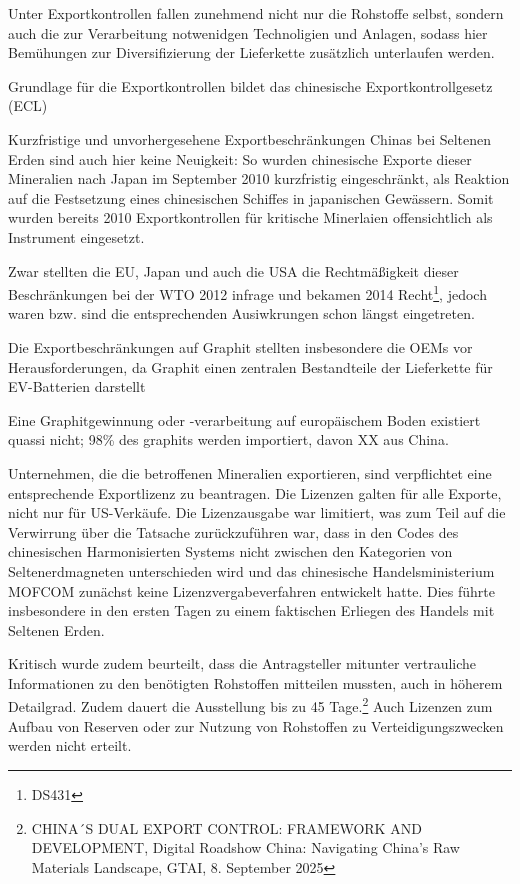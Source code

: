 \documentclass[12pt,a4paper,oneside]{book} %
\begin{document}
Unter Exportkontrollen fallen zunehmend nicht nur die Rohstoffe selbst, sondern auch die zur Verarbeitung notwenidgen Technoligien und Anlagen, sodass hier Bemühungen zur Diversifizierung der Lieferkette zusätzlich unterlaufen werden.\autocite{IEA Bericht 2026, S. 11.}

Grundlage für die Exportkontrollen bildet das chinesische Exportkontrollgesetz (ECL)

Kurzfristige und unvorhergesehene Exportbeschränkungen Chinas bei Seltenen Erden sind auch hier keine Neuigkeit: So wurden chinesische Exporte dieser Mineralien nach Japan im September 2010 kurzfristig eingeschränkt, als Reaktion auf die Festsetzung eines chinesischen Schiffes in japanischen Gewässern. Somit wurden bereits 2010 Exportkontrollen für kritische Minerlaien offensichtlich als Instrument eingesetzt.

Zwar stellten die EU, Japan und auch die USA die Rechtmäßigkeit dieser Beschränkungen bei der WTO 2012 infrage und bekamen 2014 Recht\footnote{DS431}, jedoch waren bzw. sind die entsprechenden Ausiwkrungen schon längst eingetreten.

Die Exportbeschränkungen auf Graphit stellten insbesondere die OEMs vor Herausforderungen, da Graphit einen zentralen Bestandteile der Lieferkette für EV-Batterien darstellt

Eine Graphitgewinnung oder -verarbeitung auf europäischem Boden existiert quassi nicht; 98\% des graphits werden importiert, davon XX aus China.

Unternehmen, die die betroffenen Mineralien exportieren, sind verpflichtet eine entsprechende Exportlizenz zu beantragen.\autocite[Dessen Beantragung veranschlagt sechs Wochen;]{Wolf. Edda: China führt Exportauflagen für kritische Metalle ein, GTAI} Die Lizenzen galten für alle Exporte, nicht nur für US-Verkäufe. Die Lizenzausgabe war limitiert, was zum Teil auf die Verwirrung über die Tatsache zurückzuführen war, dass in den Codes des chinesischen Harmonisierten Systems nicht zwischen den Kategorien von Seltenerdmagneten unterschieden wird und das chinesische Handelsministerium MOFCOM zunächst keine Lizenzvergabeverfahren entwickelt hatte. Dies führte insbesondere in den ersten Tagen zu einem faktischen Erliegen des Handels mit Seltenen Erden.

Kritisch wurde zudem beurteilt, dass die Antragsteller mitunter vertrauliche Informationen zu den benötigten Rohstoffen mitteilen mussten, auch in höherem Detailgrad. Zudem dauert die Ausstellung bis zu 45 Tage.\footnote{CHINA´S DUAL EXPORT CONTROL: FRAMEWORK AND DEVELOPMENT, Digital Roadshow China: Navigating China’s Raw Materials Landscape, GTAI, 8. September 2025} Auch Lizenzen zum Aufbau von Reserven oder zur Nutzung von Rohstoffen zu Verteidigungszwecken werden nicht erteilt.
\end{document}
